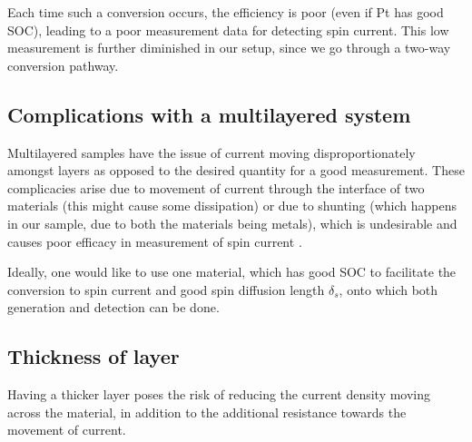 Each time such a conversion occurs, the efficiency is poor (even if Pt has good SOC), leading to a poor measurement data for detecting spin current. This low measurement is further diminished in our setup, since we go through a two-way conversion pathway.

\subsection{Complications with a multilayered system}

Multilayered samples have the issue of current moving disproportionately amongst layers as opposed to the desired quantity for a good measurement.
These complicacies arise due to movement of current through the interface of two materials (this might cause some dissipation) or due to shunting (which happens in our sample, due to both the materials being metals), which is undesirable and causes poor efficacy in measurement of spin current \cite{maekawa2017spin}.

Ideally, one would like to use one material, which has good SOC to facilitate the conversion to spin current and good spin diffusion length \( \delta_s \), onto which both generation and detection can be done.

\subsection{Thickness of layer}

Having a thicker layer poses the risk of reducing the current density moving across the material, in addition to the additional resistance towards the movement of current.
